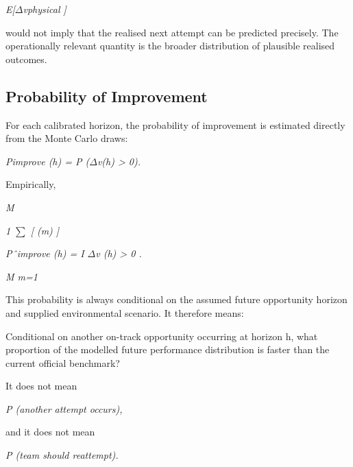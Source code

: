 \begin{center}\textit{E[\ensuremath{\Delta}vphysical ]}\end{center}

would not imply that the realised next attempt can be predicted precisely. The operationally relevant quantity is the broader distribution of plausible realised outcomes.

\subsection{Probability of Improvement}
For each calibrated horizon, the probability of improvement is estimated directly from the Monte Carlo draws:

\begin{center}\textit{Pimprove (h) = P (\ensuremath{\Delta}v(h) > 0).}\end{center}

Empirically,

\begin{center}\textit{M}\end{center}

\begin{center}\textit{1 \ensuremath{\sum} [ (m)       ]}\end{center}

\begin{center}\textit{Pˆimprove (h) =       I \ensuremath{\Delta}v (h) > 0 .}\end{center}

\begin{center}\textit{M m=1}\end{center}

This probability is always conditional on the assumed future opportunity horizon and supplied environmental scenario. It therefore means:

Conditional on another on-track opportunity occurring at horizon h, what proportion of the modelled future performance distribution is faster than the current official benchmark?

It does not mean

\begin{center}\textit{P (another attempt occurs),}\end{center}

and it does not mean

\begin{center}\textit{P (team should reattempt).}\end{center}


